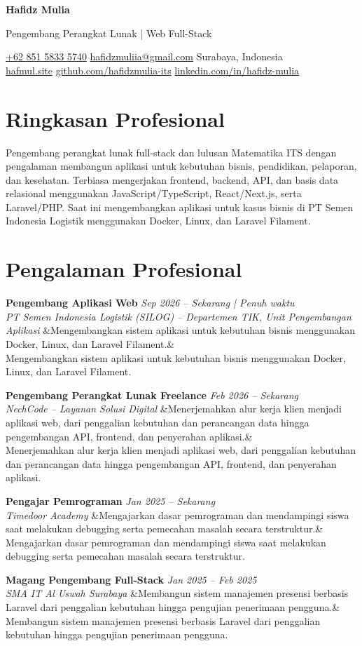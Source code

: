 \documentclass[a4paper,10pt]{article}
\newcommand{\cvname}[1]{%
  {\centering\LARGE\bfseries #1\par\vspace{2pt}}%
}
\newcommand{\cvtitle}[1]{%
  {\centering\large\color{accent} #1\par\vspace{3pt}}%
}
\newcommand{\cvcontact}[1]{%
  {\centering\small #1\par\vspace{5pt}}%
}
\newcommand{\cventry}[4]{%
  \noindent\textbf{#1} \hfill \textit{#3} \\
  \textit{#2}
  \ifx&#4& \else \\ \small #4 \fi
  \vspace{2pt}
}
\begin{document}
\cvname{Hafidz Mulia}
\cvtitle{Pengembang Perangkat Lunak | Web Full-Stack}
\cvcontact{%
  \href{tel:+6285158335740}{+62 851 5833 5740} \quad\textbar\quad
  \href{mailto:hafidzmuliia@gmail.com}{hafidzmuliia@gmail.com} \quad\textbar\quad
  Surabaya, Indonesia \\
  \href{https://hafmul.site}{hafmul.site} \quad\textbar\quad
  \href{https://github.com/hafidzmulia-its}{github.com/hafidzmulia-its} \quad\textbar\quad
  \href{https://www.linkedin.com/in/hafidz-mulia/}{linkedin.com/in/hafidz-mulia}
}

\section{Ringkasan Profesional}
Pengembang perangkat lunak full-stack dan lulusan Matematika ITS dengan pengalaman membangun aplikasi untuk kebutuhan bisnis, pendidikan, pelaporan, dan kesehatan. Terbiasa mengerjakan frontend, backend, API, dan basis data relasional menggunakan JavaScript/TypeScript, React/Next.js, serta Laravel/PHP. Saat ini mengembangkan aplikasi untuk kasus bisnis di PT Semen Indonesia Logistik menggunakan Docker, Linux, dan Laravel Filament.

\section{Pengalaman Profesional}
\cventry
  {Pengembang Aplikasi Web}
  {PT Semen Indonesia Logistik (SILOG) -- Departemen TIK, Unit Pengembangan Aplikasi}
  {Sep 2026 -- Sekarang | Penuh waktu}
  {Mengembangkan sistem aplikasi untuk kebutuhan bisnis menggunakan Docker, Linux, dan Laravel Filament.}

\cventry
  {Pengembang Perangkat Lunak Freelance}
  {NechCode -- Layanan Solusi Digital}
  {Feb 2026 -- Sekarang}
  {Menerjemahkan alur kerja klien menjadi aplikasi web, dari penggalian kebutuhan dan perancangan data hingga pengembangan API, frontend, dan penyerahan aplikasi.}

\cventry
  {Pengajar Pemrograman}
  {Timedoor Academy}
  {Jan 2025 -- Sekarang}
  {Mengajarkan dasar pemrograman dan mendampingi siswa saat melakukan debugging serta pemecahan masalah secara terstruktur.}

\cventry
  {Magang Pengembang Full-Stack}
  {SMA IT Al Uswah Surabaya}
  {Jan 2025 -- Feb 2025}
  {Membangun sistem manajemen presensi berbasis Laravel dari penggalian kebutuhan hingga pengujian penerimaan pengguna.}
\end{document}
